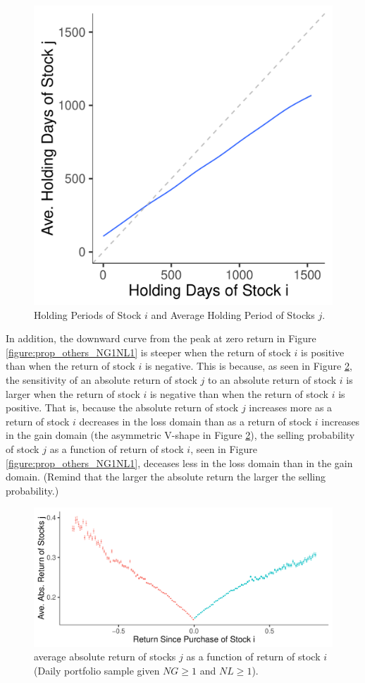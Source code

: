 \documentclass[11pt, a4paper]{article}
\begin{document}
\begin{figure}[H]
	\centering
	\includegraphics[width=0.5\columnwidth]{barc_holding_days_i_j_NG1_NL1.pdf}
	\caption{Holding Periods of Stock $i$ and Average Holding Period of Stocks $j$.}
	\label{figure:holding_days_i_j_NG1NL1}
\end{figure}


In addition, the downward curve from the peak at zero return in Figure \ref{figure:prop_others_NG1NL1} is steeper when the return of stock $i$ is positive than when the return of stock $i$ is negative. This is because, as seen in Figure \ref{figure:ret_i_abs_j_NG1NL1}, the sensitivity of an absolute return of stock $j$ to an absolute return of stock $i$ is larger when the return of stock $i$ is negative than when the return of stock $i$ is positive. 
That is, because the absolute return of stock $j$ increases more as a return of stock $i$ decreases in the loss domain than as a return of stock $i$ increases in the gain domain (the asymmetric V-shape in Figure \ref{figure:ret_i_abs_j_NG1NL1}), the selling probability of stock $j$ as a function of return of stock $i$, seen in Figure \ref{figure:prop_others_NG1NL1}, deceases less in the loss domain than in the gain domain.
(Remind that the larger the absolute return the larger the selling probability.)  


\begin{figure}[H]
	\centering
	\includegraphics[width=0.8\columnwidth]{barc_R_i_abs_R_j_NG1_NL1.pdf}
	\caption{average absolute return of stocks $j$ as a function of return of stock $i$ (Daily portfolio sample given $NG\geq1$ and $NL\geq1$).}
	\label{figure:ret_i_abs_j_NG1NL1}
\end{figure}
\end{document}
